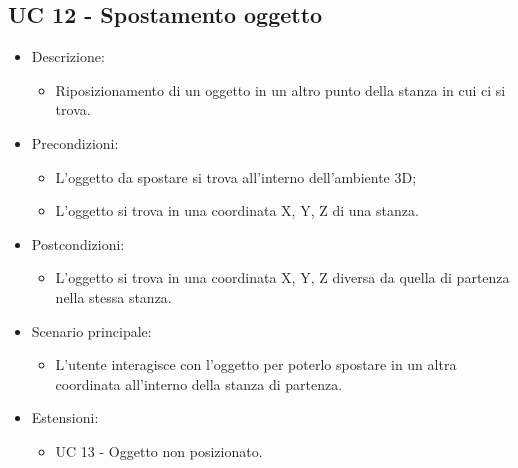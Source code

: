 \subsection{UC 12 - Spostamento oggetto}
\begin{itemize}

	\item Descrizione:
	\begin{itemize}
		\item Riposizionamento di un oggetto in un altro punto della stanza in cui ci si trova.
	\end{itemize}
	
	\item Precondizioni:
	\begin{itemize}
		\item L'oggetto da spostare si trova all'interno dell'ambiente 3D;
		\item L'oggetto si trova in una coordinata X, Y, Z di una stanza.
	\end{itemize}
	
	\item Postcondizioni:
	\begin{itemize}
		\item L'oggetto si trova in una coordinata X, Y, Z diversa da quella di partenza nella stessa stanza.
	\end{itemize}
	
	\item Scenario principale:
	\begin{itemize}
		\item L'utente interagisce con l'oggetto per poterlo spostare in un altra coordinata all'interno della stanza di partenza.
	\end{itemize}
	
	\item Estensioni:
	\begin{itemize}
		\item UC 13 - Oggetto non posizionato.
	\end{itemize}
	
\end{itemize}


